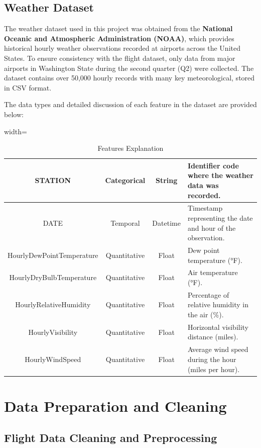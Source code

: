 \documentclass[a4paper,12pt]{report}
\begin{document}
\subsection{Weather Dataset}
The weather dataset used in this project was obtained from the \textbf{National Oceanic and Atmospheric Administration (NOAA)}, which provides historical hourly weather observations recorded at airports across the United States. To ensure consistency with the flight dataset, only data from major airports in Washington State during the second quarter (Q2) were collected. The dataset contains over 50,000 hourly records with many key meteorological, stored in CSV format.

The data types and detailed discussion of each feature in the dataset are provided below:
\begin{table}[H]
\centering
\begin{adjustbox}{width=\textwidth}
\begin{tabular}{|c|c|c|l|}
\hline
STATION & Categorical & String & Identifier code where the weather data was recorded. \\ 
\hline
DATE & Temporal & Datetime & Timestamp representing the date and hour of the observation. \\ 
\hline
HourlyDewPointTemperature & Quantitative & Float & Dew point temperature (°F). \\ 
\hline
HourlyDryBulbTemperature & Quantitative & Float & Air temperature (°F). \\ 
\hline
HourlyRelativeHumidity & Quantitative & Float & Percentage of relative humidity in the air (\%). \\ 
\hline
HourlyVisibility & Quantitative & Float & Horizontal visibility distance (miles). \\ 
\hline
HourlyWindSpeed & Quantitative & Float & Average wind speed during the hour (miles per hour). \\ 
\hline
\end{tabular}
\end{adjustbox}
\caption{Features Explanation}
\end{table}

\section{Data Preparation and Cleaning}
\subsection*{Flight Data Cleaning and Preprocessing}
\end{document}
